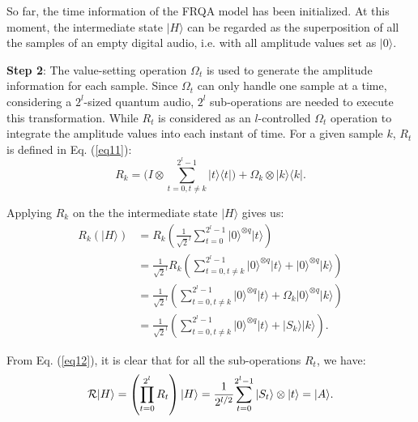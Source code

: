 \documentclass[10pt,journal,compsoc]{IEEEtran}
\begin{document}
So far, the time information of the FRQA model has been initialized. At this moment, the intermediate state $\vert H \rangle$ can be regarded as the superposition of all the samples of an empty digital audio, i.e. with all amplitude values set as $\vert 0\rangle$.

\textbf{Step 2}: The value-setting operation $\Omega_{t}$ is used to generate the amplitude information for each sample. Since $\Omega_{t}$ can only handle one sample at a time, considering a $2^l$-sized quantum audio, $2^l$ sub-operations are needed to execute this transformation. While $R_t$ is considered as an $l$-controlled $\Omega_{t}$ operation to integrate the amplitude values into each instant of time. For a given sample $k$, $R_t$ is defined in Eq. (\ref{eq11}):
\begin{equation}\label{eq11}
R_k = \Bigg (I \otimes {\sum_{t=0, t \neq k}^{2^l - 1}} {\vert t \rangle}{\langle t \vert} \Bigg ) + {\Omega_{k} \otimes {\vert k \rangle}{\langle k \vert}}.
\end{equation}

Applying $R_k$ on the the intermediate state $\vert H \rangle$ gives us:
\begin{equation}\label{eq12}
\begin{aligned}
R_k \left( \vert H \rangle \right) & = R_k \left( \frac{1}{\sqrt{2}^{l}} {\sum_{t=0}^{2^{l}-1}} {\vert 0 \rangle}^{\otimes q} {\vert t \rangle} \right) \\
& = \frac{1}{\sqrt{2}^{l}} R_k \left( {\sum_{t=0, t \neq k}^{2^l - 1}} {\vert 0 \rangle}^{\otimes q} {\vert t \rangle} + {\vert 0 \rangle}^{\otimes q} {\vert k \rangle} \right) \\
& = \frac{1}{\sqrt{2}^{l}} \left( {\sum_{t=0, t \neq k}^{2^l - 1}} {\vert 0 \rangle}^{\otimes q} {\vert t \rangle} + \Omega_{k} {\vert 0 \rangle}^{\otimes q} {\vert k \rangle} \right) \\
& = \frac{1}{\sqrt{2}^{l}} \left( {\sum_{t=0, t \neq k}^{2^l - 1}} {\vert 0 \rangle}^{\otimes q} {\vert t \rangle} + {\vert S_k \rangle} {\vert k \rangle} \right).
\end{aligned}
\end{equation}

From Eq. (\ref{eq12}), it is clear that for all the sub-operations $R_t$, we have:
\begin{equation}\label{eq13}
\mathcal{R} {\vert H \rangle} = \left( \prod_{t = 0}^{2^l} R_t \right) {\vert H \rangle} = {1\over 2^{l/2}}{\sum_{t=0}^{2^{l} - 1}{\vert S_t\rangle}\otimes \vert t\rangle} = \vert A \rangle.
\end{equation}
\end{document}
